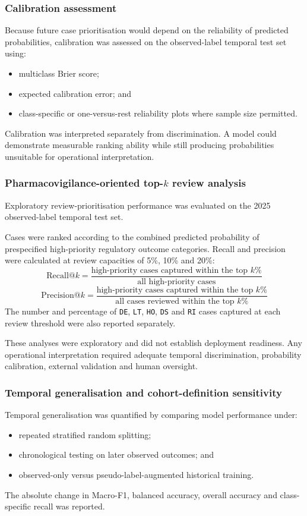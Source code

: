 \documentclass[10pt]{article}
\begin{document}
\subsubsection{Calibration assessment}
Because future case prioritisation would depend on the reliability of predicted probabilities, calibration was assessed on the observed-label temporal test set using:
\begin{itemize}
\item multiclass Brier score;
\item expected calibration error; and
\item class-specific or one-versus-rest reliability plots where sample size permitted.
\end{itemize}
Calibration was interpreted separately from discrimination. A model could demonstrate measurable ranking ability while still producing probabilities unsuitable for operational interpretation.

\subsubsection{Pharmacovigilance-oriented top-$k$ review analysis}
Exploratory review-prioritisation performance was evaluated on the 2025 observed-label temporal test set.

Cases were ranked according to the combined predicted probability of prespecified high-priority regulatory outcome categories. Recall and precision were calculated at review capacities of 5\%, 10\% and 20\%:
\begin{equation}
\mathrm{Recall@}k = \frac{\text{high-priority cases captured within the top } k\%}{\text{all high-priority cases}}
\end{equation}
\begin{equation}
\mathrm{Precision@}k = \frac{\text{high-priority cases captured within the top } k\%}{\text{all cases reviewed within the top } k\%}
\end{equation}
The number and percentage of \texttt{DE}, \texttt{LT}, \texttt{HO}, \texttt{DS} and \texttt{RI} cases captured at each review threshold were also reported separately.

These analyses were exploratory and did not establish deployment readiness. Any operational interpretation required adequate temporal discrimination, probability calibration, external validation and human oversight.

\subsubsection{Temporal generalisation and cohort-definition sensitivity}
Temporal generalisation was quantified by comparing model performance under:
\begin{itemize}
\item repeated stratified random splitting;
\item chronological testing on later observed outcomes; and
\item observed-only versus pseudo-label-augmented historical training.
\end{itemize}
The absolute change in Macro-F1, balanced accuracy, overall accuracy and class-specific recall was reported.
\end{document}
